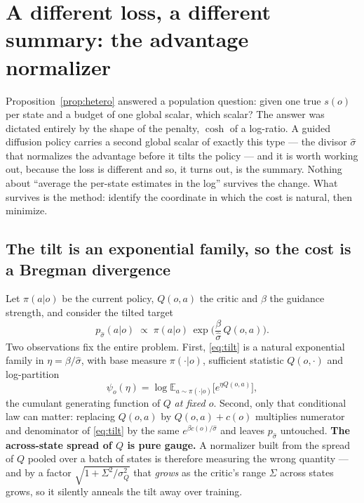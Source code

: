 \documentclass[11pt]{article}
\theoremstyle{definition}
\newcommand{\E}{\mathbb{E}}
\begin{document}
\section{A different loss, a different summary: the advantage normalizer}
\label{sec:advnorm}

Proposition~\ref{prop:hetero} answered a population question: given one true
$s(o)$ per state and a budget of one global scalar, which scalar? The answer was
dictated entirely by the shape of the penalty, $\cosh$ of a log-ratio. A guided
diffusion policy carries a second global scalar of exactly this type --- the
divisor $\hat\sigma$ that normalizes the advantage before it tilts the policy ---
and it is worth working out, because the loss is different and so, it turns out,
is the summary. Nothing about ``average the per-state estimates in the log''
survives the change. What survives is the method: identify the coordinate in
which the cost is natural, then minimize.

\subsection{The tilt is an exponential family, so the cost is a Bregman divergence}

Let $\pi(a|o)$ be the current policy, $Q(o,a)$ the critic and $\beta$ the
guidance strength, and consider the tilted target
\begin{equation}
  p_{\hat\sigma}(a|o)\;\propto\;\pi(a|o)\,
  \exp\!\Big(\frac{\beta}{\hat\sigma}\,Q(o,a)\Big).
  \label{eq:tilt}
\end{equation}
Two observations fix the entire problem. First, \eqref{eq:tilt} is a natural
exponential family in $\eta=\beta/\hat\sigma$, with base measure $\pi(\cdot|o)$,
sufficient statistic $Q(o,\cdot)$ and log-partition
\begin{equation}
  \psi_o(\eta)=\log\E_{a\sim\pi(\cdot|o)}\big[e^{\eta Q(o,a)}\big],
  \label{eq:cgf}
\end{equation}
the cumulant generating function of $Q$ \emph{at fixed $o$}. Second, only that
conditional law can matter: replacing $Q(o,a)$ by $Q(o,a)+c(o)$ multiplies
numerator and denominator of \eqref{eq:tilt} by the same $e^{\beta c(o)/\hat\sigma}$
and leaves $p_{\hat\sigma}$ untouched. \textbf{The across-state spread of $Q$ is
pure gauge.} A normalizer built from the spread of $Q$ pooled over a batch of
states is therefore measuring the wrong quantity --- and by a factor
$\sqrt{1+\Sigma^2/\sigma_Q^2}$ that \emph{grows} as the critic's range $\Sigma$
across states grows, so it silently anneals the tilt away over training.
\end{document}
